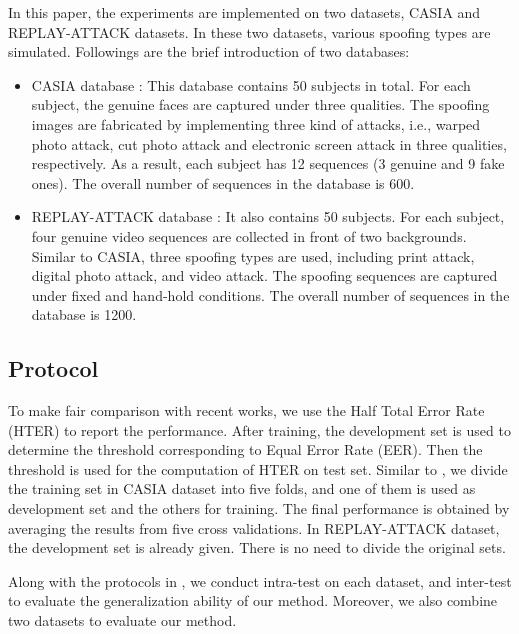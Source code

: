 \documentclass[letterpaper, 10 pt, conference]{ieeeconf}
\begin{document}
In this paper, the experiments are implemented on two datasets, CASIA and REPLAY-ATTACK datasets. In these two datasets, various spoofing types are simulated. Followings are the brief introduction of two databases:
\begin{itemize}
  \item CASIA database \cite{Face_Anti_Spoofing_DataBase_ZhiweiZhang_2012}: This database contains 50 subjects in total. For each subject, the genuine faces are captured under three qualities. The spoofing images are fabricated by implementing three kind of attacks, i.e., warped photo attack, cut photo attack and electronic screen attack in three qualities, respectively. As a result, each subject has 12 sequences (3 genuine and 9 fake ones). The overall number of sequences in the database is 600.
  \item REPLAY-ATTACK database \cite{Face_Anti_Spoofing_DataBase_Chingovska_2012}: It also contains 50 subjects. For each subject, four genuine video sequences are collected in front of two backgrounds. Similar to CASIA, three spoofing types are used, including print attack, digital photo attack, and video attack. The spoofing sequences are captured under fixed and hand-hold conditions. The overall number of sequences in the database is 1200.
\end{itemize}

\subsection{Protocol}

To make fair comparison with recent works, we use the Half Total Error Rate (HTER) to report the performance. After training, the development set is used to determine the threshold corresponding to Equal Error Rate (EER). Then the threshold is used for the computation of HTER on test set. Similar to \cite{Face_Anti_Spoofing_Pereira_2013}, we divide the training set in CASIA dataset into five folds, and one of them is used as development set and the others for training. The final performance is obtained by averaging the results from five cross validations. In REPLAY-ATTACK dataset, the development set is already given. There is no need to divide the original sets.

Along with the protocols in \cite{Face_Anti_Spoofing_Pereira_2013}, we conduct intra-test on each dataset, and inter-test to evaluate the generalization ability of our method. Moreover, we also combine two datasets to evaluate our method.
\end{document}

